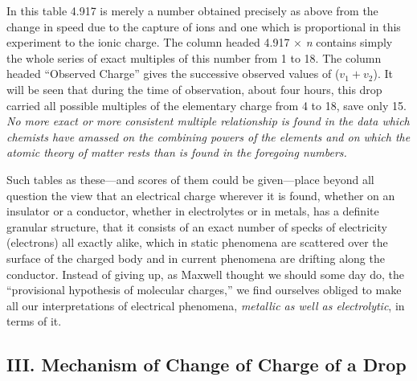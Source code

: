 In this table 4.917 is merely a number obtained precisely as above from
the change in speed due to the capture of ions and one which is
proportional in this experiment to the ionic charge. The column headed
4.917 $\times$ \emph{n} contains simply the whole series of exact multiples of
this number from 1 to 18. The column headed ``Observed Charge'' gives
the successive observed values of ($v_1 + v_2$). It will be
seen that during the time of observation, about four hours, this drop
carried all possible multiples of the elementary charge from 4 to 18,
save only 15. \emph{No more exact or more consistent multiple
relationship is found in the data which chemists have amassed on the
combining powers of the elements and on which the atomic theory of
matter rests than is found in the foregoing numbers.}

Such tables as these---and scores of them could be given---place beyond all
question the view that an electrical charge wherever it is found,
whether on an insulator or a conductor, whether in electrolytes or in
metals, has a definite granular structure, that it consists of an exact
number of specks of electricity (electrons) all exactly alike, which in
static phenomena are scattered over the surface of the charged body and
in current phenomena are drifting along the conductor. Instead of giving
up, as Maxwell thought we should some day do, the ``provisional
hypothesis of molecular charges,'' we find ourselves obliged to make all
our interpretations of electrical phenomena, \emph{metallic as well as
electrolytic}, in terms of it.

\subsection*{III. Mechanism of Change of Charge of a Drop}

